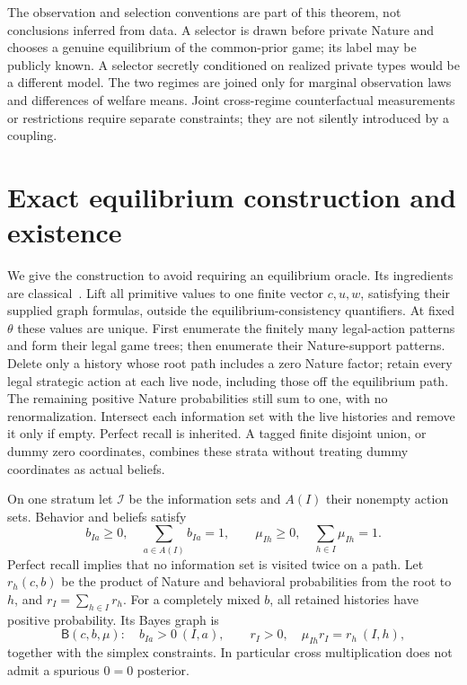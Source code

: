 \documentclass[11pt,a4paper]{article}
\numberwithin{equation}{section}
\theoremstyle{definition}
\begin{document}
The observation and selection conventions are part of this theorem, not
conclusions inferred from data. A selector is drawn before private Nature
and chooses a genuine equilibrium of the common-prior game; its label may
be publicly known. A selector secretly conditioned on realized private types
would be a different model. The two regimes are joined only for marginal
observation laws and differences of welfare means. Joint cross-regime
counterfactual measurements or restrictions require separate constraints;
they are not silently introduced by a coupling.

\section{Exact equilibrium construction and existence}\label{sec:SE}

We give the construction to avoid requiring an equilibrium oracle. Its
ingredients are classical~\cite{KW,Graf}. Lift all primitive values to one
finite vector $c,u,w$, satisfying their supplied graph formulas, outside
the equilibrium-consistency quantifiers. At fixed $\theta$ these values
are unique. First enumerate the finitely many legal-action patterns and
form their legal game trees; then enumerate their Nature-support patterns.
Delete only a history whose root path includes a zero Nature factor;
retain every legal strategic action at each live node, including those
off the equilibrium path. The remaining
positive Nature probabilities still sum to one, with no renormalization.
Intersect each information set with the live histories and remove it only
if empty. Perfect recall is inherited. A tagged finite disjoint union, or
dummy zero coordinates, combines these strata without treating dummy
coordinates as actual beliefs.

On one stratum let $\mathcal I$ be the information sets and $A(I)$ their
nonempty action sets. Behavior and beliefs satisfy
\[
 b_{Ia}\ge0,\quad\sum_{a\in A(I)}b_{Ia}=1,\qquad
 \mu_{Ih}\ge0,\quad\sum_{h\in I}\mu_{Ih}=1.
\]
Perfect recall implies that no information set is visited twice on a path.
Let $r_h(c,b)$ be the product of Nature and behavioral probabilities from
the root to $h$, and $r_I=\sum_{h\in I}r_h$. For a completely mixed $b$,
all retained histories have positive probability. Its Bayes graph is
\begin{equation}\label{eq:bayes}
 \mathsf B(c,b,\mu):
 \quad b_{Ia}>0\ (I,a),\qquad
 r_I>0,\quad \mu_{Ih}r_I=r_h\ (I,h),
\end{equation}
together with the simplex constraints. In particular cross multiplication
does not admit a spurious $0=0$ posterior.
\end{document}
